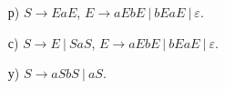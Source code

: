 \begin{hint}
  \begin{enumerate}
  \item[р)]
    $S\to EaE$, $E \to aEbE\ |\ bEaE\ |\ \varepsilon$.
  \item[с)]
    $S\to E\ |\ SaS$, $E \to aEbE\ |\ bEaE\ |\ \varepsilon$.
    
  \item[у)]
    $S \to aSbS\ |\ aS$.
  \end{enumerate}
\end{hint}

